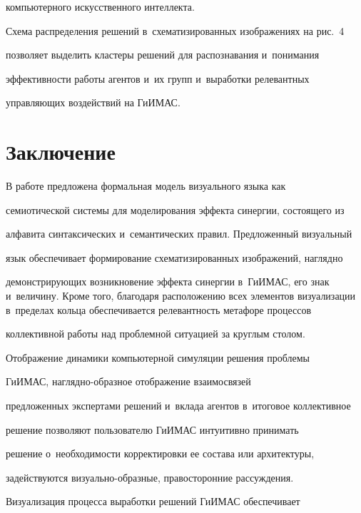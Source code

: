 компьютерного искусственного интеллекта.








  Схема распределения решений в~схематизированных изображениях на рис.~4 


позволяет выделить кластеры решений для распознавания и~понимания 


эффективности работы агентов и~их групп и~выработки релевантных 


управляющих воздействий на \mbox{ГиИМАС}. 


  


\section{Заключение}





  В работе предложена формальная модель визуального языка как 


семиотической системы для моделирования эффекта синергии, состоящего из 


алфавита синтаксических и~семантических правил. Предложенный визуальный 


язык обеспечивает формирование схематизированных изображений, наглядно 


демонстрирующих возникновение эффекта синергии в~\mbox{ГиИМАС}, его знак и~величину. Кроме того, благодаря расположению всех элементов визуализации в~пределах кольца обеспечивается релевантность метафоре процессов 


коллективной работы над проблемной ситуацией за круглым столом. 


  


  Отображение динамики компьютерной симуляции решения проблемы 


\mbox{ГиИМАС}, на\-гляд\-но-об\-раз\-ное отображение взаимосвязей 


предложенных экспертами решений и~вклада агентов в~итоговое коллективное 


решение позволяют пользователю \mbox{ГиИМАС} интуитивно принимать 


решение о~необходимости корректировки ее состава или архитектуры, 


задействуются ви\-зу\-аль\-но-об\-раз\-ные, правосторонние рассуждения. 


Визуализация процесса выработки решений \mbox{ГиИМАС} обеспечивает 


